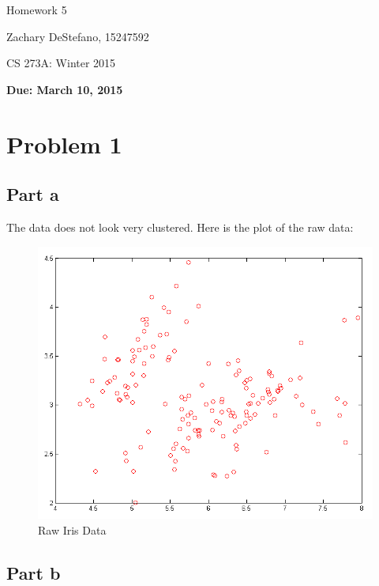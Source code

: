 \documentclass[twoside,11pt]{article}
\theoremstyle{definition}
\begin{document}
\centerline{\Large Homework 5}
\centerline{Zachary DeStefano, 15247592}
\centerline{CS 273A: Winter 2015}
\centerline{\bf Due: March 10, 2015}

\section*{Problem 1}

\subsection*{Part a}

The data does not look very clustered. Here is the plot of the raw data:

\begin{figure}[h]
\centering
\includegraphics[width=6 in]{prob1PartA.png}
\caption{Raw Iris Data}
\end{figure}

\newpage

\subsection*{Part b}
\end{document}
